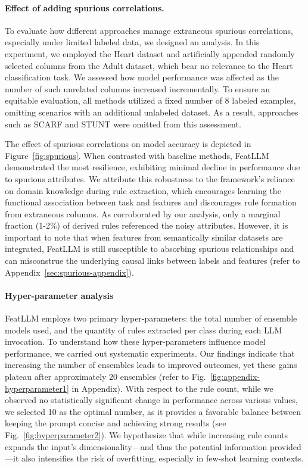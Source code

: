 \vspace*{-0.12in}
\paragraph{Effect of adding spurious correlations.} To evaluate how different approaches manage extraneous spurious correlations, especially under limited labeled data, we designed an analysis. In this experiment, we employed the Heart dataset and artificially appended randomly selected columns from the Adult dataset, which bear no relevance to the Heart classification task. We assessed how model performance was affected as the number of such unrelated columns increased incrementally. To ensure an equitable evaluation, all methods utilized a fixed number of 8 labeled examples, omitting scenarios with an additional unlabeled dataset. As a result, approaches such as SCARF and STUNT were omitted from this assessment.

The effect of spurious correlations on model accuracy is depicted in Figure~\ref{fig:spurious}. When contrasted with baseline methods, \textsf{FeatLLM} demonstrated the most resilience, exhibiting minimal decline in performance due to spurious attributes. We attribute this robustness to the framework’s reliance on domain knowledge during rule extraction, which encourages learning the functional association between task and features and discourages rule formation from extraneous columns. As corroborated by our analysis, only a marginal fraction (1-2\%) of derived rules referenced the noisy attributes. However, it is important to note that when features from semantically similar datasets are integrated, \textsf{FeatLLM} is still susceptible to absorbing spurious relationships and can misconstrue the underlying causal links between labels and features (refer to Appendix~\ref{sec:spurious-appendix}).

\vspace*{-0.12in}
\paragraph{Hyper-parameter analysis}
\textsf{FeatLLM} employs two primary hyper-parameters: the total number of ensemble models used, and the quantity of rules extracted per class during each LLM invocation. To understand how these hyper-parameters influence model performance, we carried out systematic experiments. Our findings indicate that increasing the number of ensembles leads to improved outcomes, yet these gains plateau after approximately 20 ensembles (refer to Fig.~\ref{fig:appendix-hyperparameter1} in Appendix). With respect to the rule count, while we observed no statistically significant change in performance across various values, we selected 10 as the optimal number, as it provides a favorable balance between keeping the prompt concise and achieving strong results (see Fig.~\ref{fig:hyperparameter2}). We hypothesize that while increasing rule counts expands the input's dimensionality—and thus the potential information provided—it also intensifies the risk of overfitting, especially in few-shot learning contexts.

